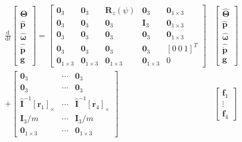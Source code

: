 \documentclass{article}
\begin{document}
\\

$$
\begin{aligned}
    \frac{\mathrm{d}}{\mathrm{d} t}\left[
    \begin{array}{c}
        \hat{\mathbf\Theta} \\
        \hat{\mathbf{p}} \\
        \hat{\mathbf{\omega}} \\
        \hat{\dot{\mathbf{p}}}\\
        \mathbf g
    \end{array}
    \right]=
    \left[
    \begin{array}{lllll}
        \mathbf{0}_{3} & \mathbf{0}_{3} & \mathbf{R}_{z}(\psi) & \mathbf{0}_{3} & \mathbf 0_{1\times 3}\\
        \mathbf{0}_{3} & \mathbf{0}_{3} & \mathbf{0}_{3} & \mathbf{I}_{3} & \mathbf 0_{1\times 3}\\
        \mathbf{0}_{3} & \mathbf{0}_{3} & \mathbf{0}_{3} & \mathbf{0}_{3} & \mathbf 0_{1\times 3}\\
        \mathbf{0}_{3} & \mathbf{0}_{3} & \mathbf{0}_{3} & \mathbf{0}_{3} & [0\ 0\ 1]^T\\
        \mathbf{0}_{1\times 3} & \mathbf{0}_{1\times 3} & \mathbf{0}_{1\times 3} & \mathbf{0}_{1\times 3} & 0
    \end{array}
    \right]&\left[
    \begin{array}{c}
        \hat{\mathbf{\Theta}} \\
        \hat{\mathbf{p}} \\
        \hat{\mathbf \omega} \\
        \hat{\dot{\mathbf{p}}}\\
        \mathbf g
    \end{array}\right]\\
    +\left[
    \begin{array}{lll}
        \mathbf{0}_{3} & \cdots & \mathbf{0}_{3} \\
        \mathbf{0}_{3} & \cdots & \mathbf{0}_{3} \\
        \hat{\mathbf{I}}^{-1}\left[\mathbf{r}_{1}\right]_{\times} & \cdots & \hat{\mathbf{I}}^{-1}\left[\mathbf{r}_{4}\right]_\times \\
        \mathbf{I}_{3} / m & \cdots & \mathbf{I}_{3} / m\\
        \mathbf{0}_{1\times 3}&\cdots&\mathbf{0}_{1\times 3}
    \end{array}
    \right]
    &\left[\begin{array}{c}
    \mathbf{f}_{1} \\
    \vdots \\
    \mathbf{f}_{4}
    \end{array}\right]
\end{aligned}
$$
\end{document}
